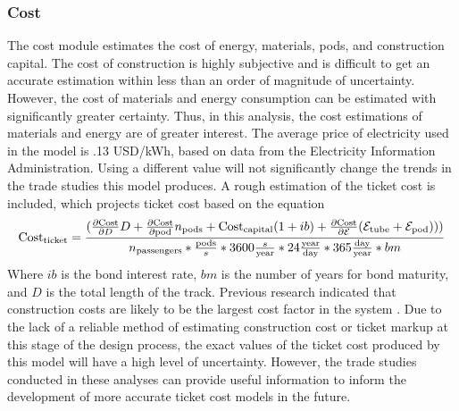 \subsubsection{Cost}
	The cost module estimates the cost of energy, materials, pods, and
	construction capital. The cost of construction is highly subjective and is
	difficult to get an accurate estimation within less than an order of
	magnitude of uncertainty. However, the cost of materials and energy
	consumption can be estimated with significantly greater certainty.
	Thus, in this analysis, the cost estimations of materials and energy are of greater interest.
	The average price of electricity used in the model is .13 USD/kWh, based on
	data from the Electricity Information Administration\cite{EIA}.
	Using a different value will not significantly change the trends in the trade studies this model produces.
	A rough estimation of the ticket cost is included, which projects ticket cost based on the equation
	\begin{equation}
		\label{eq:ticket_cost}
    \text{Cost}_\text{ticket} = \frac{ (\frac{\partial \text{Cost}}{\partial D}D+\frac{\partial \text{Cost} }{\partial \text{pod}}n_{\text{pods}}+\text{Cost}_\text{capital} ( 1+ib ) + \frac{\partial \text{Cost}}{\partial \mathcal{E}} (\mathcal{E}_\text{tube} + \mathcal{E}_\text{pod}  ))  )}{n_\text{passengers}*\frac{\text{pods}}{s}*3600\frac{s}{\text{\text{year}}}*24\frac{\text{\text{year}}}{\text{day}}*365\frac{\text{day}}{\text{year}}*bm}
	\end{equation}
	Where $ib$ is the bond interest rate, $bm$ is the number of years for bond
	maturity, and $D$ is the total length of the track. Previous research
	indicated that construction costs are likely to be the largest cost factor
	in the system \cite{Musk}. Due to the lack of a reliable method of
	estimating construction cost or ticket markup at this stage of the design process,
	the exact values of the ticket cost produced by this model will have a high level of uncertainty.
	However, the trade studies conducted in these analyses can provide useful
	information to inform the development of more accurate ticket cost models in the future.
